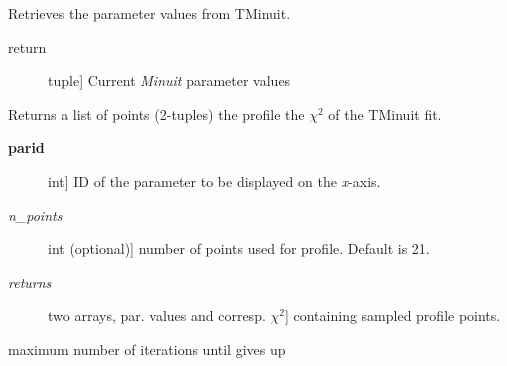 \documentclass[a4paper,10pt,english]{sphinxmanual}
\begin{document}
\begin{fulllineitems}
\begin{fulllineitems}
\begin{description}
\end{description}

\end{fulllineitems}


\begin{fulllineitems}
\label{index:kafe.minuit.Minuit.get_parameter_values}
Retrieves the parameter values from TMinuit.
\begin{description}
\item[{return}] \leavevmode{[}tuple{]}
Current \emph{Minuit} parameter values

\end{description}

\end{fulllineitems}


\begin{fulllineitems}
\label{index:kafe.minuit.Minuit.get_profile}
Returns a list of points (2-tuples) the profile
the \(\chi^2\)  of the TMinuit fit.
\begin{description}
\item[{\textbf{parid}}] \leavevmode{[}int{]}
ID of the parameter to be displayed on the \emph{x}-axis.

\item[{\emph{n\_points}}] \leavevmode{[}int (optional){]}
number of points used for profile. Default is 21.

\item[{\emph{returns}}] \leavevmode{[}two arrays, par. values and corresp. \(\chi^2\){]}
containing  sampled profile points.

\end{description}

\end{fulllineitems}


\begin{fulllineitems}
\label{index:kafe.minuit.Minuit.max_iterations}
maximum number of iterations until  gives up

\end{fulllineitems}


\end{fulllineitems}
\end{document}
